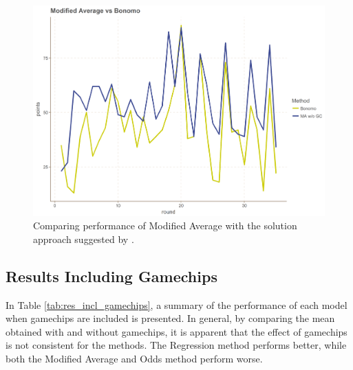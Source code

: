 \begin{figure}[H]
    \centering
    \includegraphics[scale=0.5]{fig/chapter_7/bon_gc_no_gc.png}
    \caption{Comparing performance of Modified Average with the solution approach suggested by \cite{Bonomo}.}
\label{fig:avg_vs_bon}    
\end{figure}

\begin{table}[H]
\centering
{}
\caption{Performance of Modified Average and \cite{Bonomo}}
\label{tab:bonomo_mofidified_average}
\end{table}


\subsection{Results Including Gamechips}

In Table \ref{tab:res_incl_gamechips}, a summary of the performance of each model when gamechips are included is presented. In general, by comparing the mean obtained with and without gamechips, it is apparent that the effect of gamechips is not consistent for the methods. The Regression method performs better, while both the Modified Average and Odds method perform worse.

